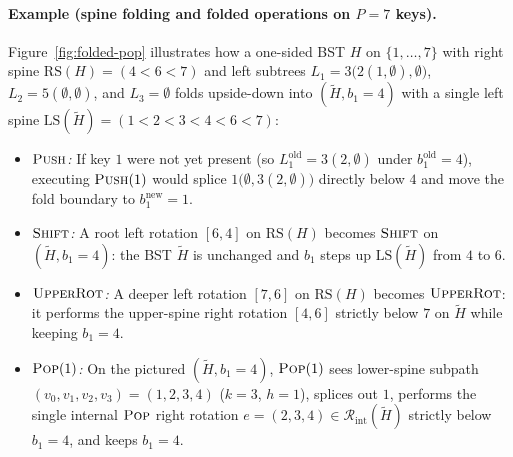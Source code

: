 \documentclass[11pt]{article}
\theoremstyle{definition}
\theoremstyle{remark}
\newcommand{\LS}{\mathrm{LS}}
\newcommand{\RS}{\mathrm{RS}}
\newcommand{\PUSH}{\textnormal{\scshape Push}}
\newcommand{\POP}{\textnormal{\scshape Pop}}
\newcommand{\SHIFT}{\textnormal{\scshape Shift}}
\newcommand{\UPROT}{\textnormal{\scshape UpperRot}}
\begin{document}
\paragraph{Example (spine folding and folded operations on $P = 7$ keys).}
Figure~\ref{fig:folded-pop} illustrates how a one-sided BST $H$ on $\{1, \dots, 7\}$ with right spine $\RS(H) = (4 < 6 < 7)$ and left subtrees $L_1 = 3\big(2(1, \emptyset), \emptyset\big)$, $L_2 = 5(\emptyset, \emptyset)$, and $L_3 = \emptyset$ folds upside-down into $(\widetilde{H}, b_1 = 4)$ with a single left spine $\LS(\widetilde{H}) = (1 < 2 < 3 < 4 < 6 < 7)$:
\begin{itemize}[leftmargin=2em, itemsep=1pt]
  \item \emph{$\PUSH$:} If key $1$ were not yet present (so $L_1^{\mathrm{old}} = 3(2, \emptyset)$ under $b_1^{\mathrm{old}} = 4$), executing $\PUSH(1)$ would splice $1\big(\emptyset, 3(2, \emptyset)\big)$ directly below $4$ and move the fold boundary to $b_1^{\mathrm{new}} = 1$.
  \item \emph{$\SHIFT$:} A root left rotation $[6, 4]$ on $\RS(H)$ becomes $\SHIFT$ on $(\widetilde{H}, b_1 = 4)$: the BST $\widetilde{H}$ is unchanged and $b_1$ steps up $\LS(\widetilde{H})$ from $4$ to $6$.
  \item \emph{$\UPROT$:} A deeper left rotation $[7, 6]$ on $\RS(H)$ becomes $\UPROT$: it performs the upper-spine right rotation $[4, 6]$ strictly below $7$ on $\widetilde{H}$ while keeping $b_1 = 4$.
  \item \emph{$\POP(1)$:} On the pictured $(\widetilde{H}, b_1 = 4)$, $\POP(1)$ sees lower-spine subpath $(v_0, v_1, v_2, v_3) = (1, 2, 3, 4)$ ($k = 3$, $h = 1$), splices out $1$, performs the single internal $\POP$ right rotation $e = (2, 3, 4) \in \mathcal{R}_{\mathrm{int}}(\widetilde{H})$ strictly below $b_1 = 4$, and keeps $b_1 = 4$.
\end{itemize}
\end{document}
